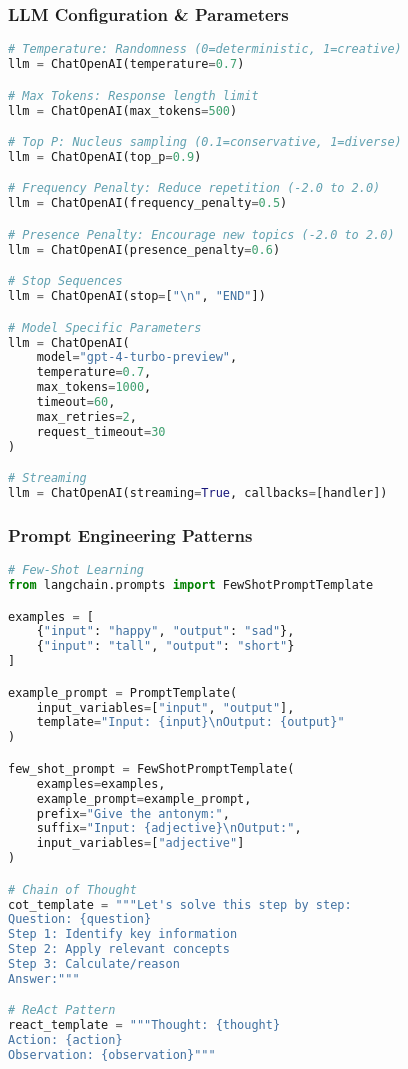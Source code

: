 \begin{frame}[fragile]\frametitle{LLM Configuration \& Parameters}
\begin{lstlisting}[language=python,basicstyle=\tiny]
# Temperature: Randomness (0=deterministic, 1=creative)
llm = ChatOpenAI(temperature=0.7)

# Max Tokens: Response length limit
llm = ChatOpenAI(max_tokens=500)

# Top P: Nucleus sampling (0.1=conservative, 1=diverse)
llm = ChatOpenAI(top_p=0.9)

# Frequency Penalty: Reduce repetition (-2.0 to 2.0)
llm = ChatOpenAI(frequency_penalty=0.5)

# Presence Penalty: Encourage new topics (-2.0 to 2.0)
llm = ChatOpenAI(presence_penalty=0.6)

# Stop Sequences
llm = ChatOpenAI(stop=["\n", "END"])

# Model Specific Parameters
llm = ChatOpenAI(
    model="gpt-4-turbo-preview",
    temperature=0.7,
    max_tokens=1000,
    timeout=60,
    max_retries=2,
    request_timeout=30
)

# Streaming
llm = ChatOpenAI(streaming=True, callbacks=[handler])
\end{lstlisting}
\end{frame}

\begin{frame}[fragile]\frametitle{Prompt Engineering Patterns}
\begin{lstlisting}[language=python,basicstyle=\tiny]
# Few-Shot Learning
from langchain.prompts import FewShotPromptTemplate

examples = [
    {"input": "happy", "output": "sad"},
    {"input": "tall", "output": "short"}
]

example_prompt = PromptTemplate(
    input_variables=["input", "output"],
    template="Input: {input}\nOutput: {output}"
)

few_shot_prompt = FewShotPromptTemplate(
    examples=examples,
    example_prompt=example_prompt,
    prefix="Give the antonym:",
    suffix="Input: {adjective}\nOutput:",
    input_variables=["adjective"]
)

# Chain of Thought
cot_template = """Let's solve this step by step:
Question: {question}
Step 1: Identify key information
Step 2: Apply relevant concepts
Step 3: Calculate/reason
Answer:"""

# ReAct Pattern
react_template = """Thought: {thought}
Action: {action}
Observation: {observation}"""
\end{lstlisting}
\end{frame}

